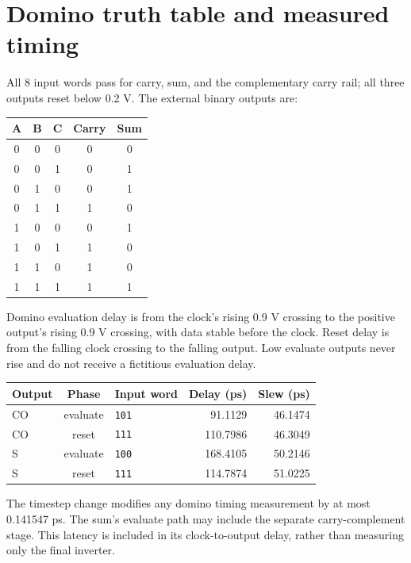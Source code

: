 \documentclass[11pt]{article}
\begin{document}
\newpage\section*{Domino truth table and measured timing}
All 8 input words pass for carry, sum, and the complementary carry rail; all three outputs reset below 0.2 V. The external binary outputs are:
\begin{center}\begin{tabular}{ccc|cc}\toprule A&B&C&Carry&Sum\\\midrule
0&0&0&0&0\\0&0&1&0&1\\0&1&0&0&1\\0&1&1&1&0\\1&0&0&0&1\\1&0&1&1&0\\1&1&0&1&0\\1&1&1&1&1\\\bottomrule\end{tabular}\end{center}
Domino evaluation delay is from the clock's rising 0.9 V crossing to the positive output's rising 0.9 V crossing, with data stable before the clock. Reset delay is from the falling clock crossing to the falling output. Low evaluate outputs never rise and do not receive a fictitious evaluation delay.
\begin{center}\begin{tabular}{lclrr}\toprule Output&Phase&Input word&Delay (ps)&Slew (ps)\\\midrule
CO&evaluate&\texttt{101}&91.1129&46.1474\\
CO&reset&\texttt{111}&110.7986&46.3049\\
S&evaluate&\texttt{100}&168.4105&50.2146\\
S&reset&\texttt{111}&114.7874&51.0225\\
\bottomrule\end{tabular}\end{center}
The timestep change modifies any domino timing measurement by at most 0.141547 ps. The sum's evaluate path may include the separate carry-complement stage. This latency is included in its clock-to-output delay, rather than measuring only the final inverter.
\end{document}
